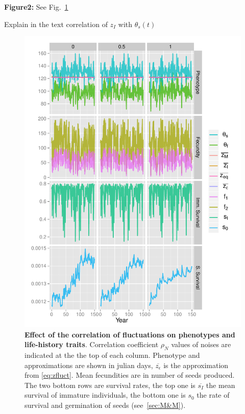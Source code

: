 \textbf{Figure2:} See Fig.~\ref{fig:corr}

Explain in the text correlation of $z_{I}$ with $\theta_{s}(t)$

\begin{figure}[ht!]
	\centering
	\includegraphics[scale=1]{Figures/PhenoLHTwithCorr.pdf}
	\caption{\textbf{Effect of the correlation of fluctuations on phenotypes and life-history traits}. Correlation coefficient $\rho_{N}$ values of noises are indicated at the the top of each column. Phenotype and approximations are shown in julian days, $\overline{z_\epsilon}$ is the approximation from \autoref{eq:zfluct}. Mean fecundities are in number of seeds produced. The two bottom rows are survival rates, the top one is $\overline{s_I}$ the mean survival of immature individuals, the bottom one is $s_0$ the rate of survival and germination of seeds (see~\autoref{sec:M&M}).}
	\label{fig:corr}
\end{figure}

